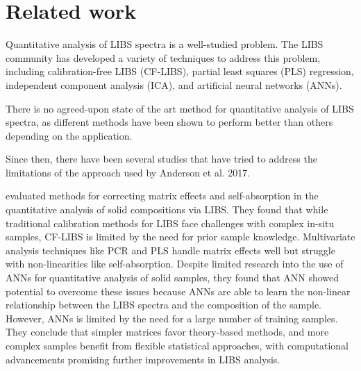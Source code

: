 \section{Related work}\label{sec:related_works}


Quantitative analysis of LIBS spectra is a well-studied problem.
The LIBS community has developed a variety of techniques to address this problem, including calibration-free LIBS (CF-LIBS), partial least squares (PLS) regression, independent component analysis (ICA), and artificial neural networks (ANNs).

There is no agreed-upon state of the art method for quantitative analysis of LIBS spectra, as different methods have been shown to perform better than others depending on the application.


Since then, there have been several studies that have tried to address the limitations of the approach used by Anderson et al. 2017.

\citeauthor{takahashi_quantitative_2017} \cite{takahashi_quantitative_2017} evaluated methods for correcting matrix effects and self-absorption in the quantitative analysis of solid compositions via LIBS.
They found that while traditional calibration methods for LIBS face challenges with complex in-situ samples, CF-LIBS is limited by the need for prior sample knowledge.
Multivariate analysis techniques like PCR and PLS handle matrix effects well but struggle with non-linearities like self-absorption.
Despite limited research into the use of ANNs for quantitative analysis of solid samples, they found that ANN showed potential to overcome these issues because ANNs are able to learn the non-linear relationship between the LIBS spectra and the composition of the sample.
However, ANNs is limited by the need for a large number of training samples.
They conclude that simpler matrices favor theory-based methods, and more complex samples benefit from flexible statistical approaches, with computational advancements promising further improvements in LIBS analysis.

